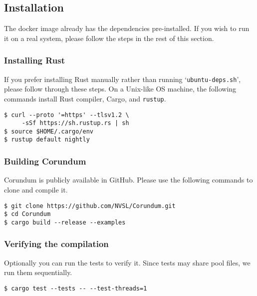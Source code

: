 {\subsection{Installation}

The docker image already has the dependencies pre-installed. If you wish to run it on a real system, please follow the steps in the rest of this section.

\subsubsection{Installing Rust}

If you prefer installing Rust manually rather than running `\verb+ubuntu-deps.sh+', please follow through these steps.
On a Unix-like OS machine, the following commands
install Rust compiler, Cargo, and \verb+rustup+. 

\begin{verbatim}
$ curl --proto '=https' --tlsv1.2 \
     -sSf https://sh.rustup.rs | sh
$ source $HOME/.cargo/env
$ rustup default nightly
\end{verbatim}


\subsubsection{Building Corundum}

Corundum is publicly available in GitHub. Please use
the following commands to clone and compile it.

\begin{verbatim}
$ git clone https://github.com/NVSL/Corundum.git
$ cd Corundum
$ cargo build --release --examples
\end{verbatim}

\subsubsection{Verifying the compilation}

Optionally you can run the tests to verify it.
Since tests may share pool files, we run them sequentially.

\begin{verbatim}
$ cargo test --tests -- --test-threads=1 
\end{verbatim}

}
